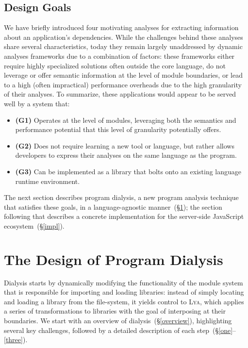 \documentclass[letterpaper,twocolumn,10pt]{article}
\newcommand{\heading}[1]{\vspace{2pt}\noindent\textbf{#1}\enspace}
\newcommand{\sx}[1]{(\S\ref{#1})}
\newcommand{\sys}{{\scshape Lya}\xspace}
\begin{document}



\subsection{Design Goals}

We have briefly introduced four motivating analyses for extracting information about an application's dependencies.
While the challenges behind these analyses share several characteristics, today they remain largely unaddressed by dynamic analyses frameworks due to a combination of factors:
  these frameworks either require highly specialized solutions often outside the core language,
  do not leverage or offer semantic information at the level of module boundaries, or
  lead to a high (often impractical) performance overheads due to the high granularity of their analyses.
To summarize, these applications would appear to be served well by a system that:
\begin{itemize}
  \item \textbf{(G1)} Operates at the level of modules, leveraging both the semantics and performance potential that this level of granularity potentially offers.
  \item \textbf{(G2)} Does not require learning a new tool or language, but rather allows developers to express their analyses on the same language as the program.
  \item \textbf{(G3)} Can be implemented as a library that bolts onto an existing language runtime environment.
\end{itemize}

The next section describes program dialysis, a new program analysis technique that satisfies these goals, in a language-agnostic manner~\sx{design};
  the section following that describes a concrete implementation for the server-side JavaScript ecosystem~\sx{impl}.

\section{The Design of Program Dialysis}
\label{design}

Dialysis starts by dynamically modifying the functionality of the module system that is responsible for importing and loading libraries:
  instead of simply locating and loading a library from the file-system, it yields control to \sys, which applies a series of transformations to libraries with the goal of interposing at their boundaries.
We start with an overview of dialysis~\sx{overview}, highlighting several key challenges, followed by a detailed description of each step~(\S\ref{one}--\ref{three}).
\end{document}

